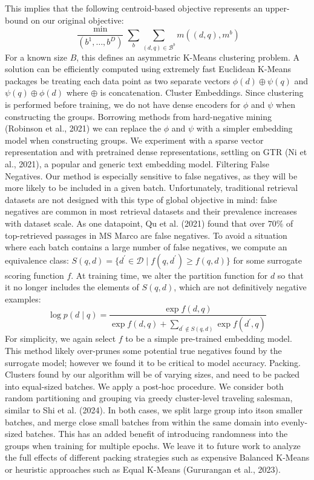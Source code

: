 This implies that the following centroid-based objective represents an upper-bound on our original objective:
\[
\frac{\min }{\left(b^{1}, \ldots, b^{D}\right)} \sum_{b} \sum_{(d, q) \in \mathcal{B}^{b}} m((d, q), m^{b})
\]
For a known size \(B\), this defines an asymmetric K-Means clustering problem. A solution can be efficiently computed using extremely fast Euclidean K-Means packages be treating each data point as two separate vectors \(\phi(d) \oplus \psi(q)\) and \(\psi(q) \oplus \phi(d)\) where \(\oplus\) is concatenation.
Cluster Embeddings. Since clustering is performed before training, we do not have dense encoders for \(\phi\) and \(\psi\) when constructing the groups. Borrowing methods from hard-negative mining (Robinson et al., 2021) we can replace the \(\phi\) and \(\psi\) with a simpler embedding model when constructing groups. We experiment with a sparse vector representation and with pretrained dense representations, settling on GTR (Ni et al., 2021), a popular and generic text embedding model.
Filtering False Negatives. Our method is especially sensitive to false negatives, as they will be more likely to be included in a given batch. Unfortunately, traditional retrieval datasets are not designed with this type of global objective in mind: false negatives are common in most retrieval datasets and their prevalence increases with dataset scale. As one datapoint, \(\mathrm{Qu}\) et al. (2021) found that over \(70 \%\) of top-retrieved passages in MS Marco are false negatives.
To avoid a situation where each batch contains a large number of false negatives, we compute an equivalence class: \(S(q, d)=\{d^{\prime} \in \mathcal{D} \mid f\left(q, d^{\prime}\right) \geq f(q, d)\}\) for some surrogate scoring function \(f\). At training time, we alter the partition function for \(d\) so that it no longer includes the elements of \(S(q, d)\), which are not definitively negative examples:
\[
\log p(d \mid q)=\frac{\exp f(d, q)}{\exp f(d, q)+\sum_{d^{\prime} \notin S(q, d)} \exp f\left(d^{\prime}, q\right)}
\]
For simplicity, we again select \(f\) to be a simple pre-trained embedding model. This method likely over-prunes some potential true negatives found by the surrogate model; however we found it to be critical to model accuracy.
Packing. Clusters found by our algorithm will be of varying sizes, and need to be packed into equal-sized batches. We apply a post-hoc procedure. We consider both random partitioning and grouping via greedy cluster-level traveling salesman, similar to Shi et al. (2024). In both cases, we split large group into itson smaller batches, and merge close small batches from within the same domain into evenly-sized batches. This has an added benefit of introducing randomness into the groups when training for multiple epochs. We leave it to future work to analyze the full effects of different packing strategies such as expensive Balanced K-Means or heuristic approaches such as Equal K-Means (Gururangan et al., 2023).
